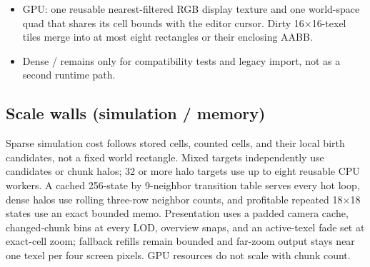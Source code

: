 \begin{itemize}
        drawn only inside their centered canonical rectangle; camera space
        outside it stays background-colored while opposite-edge simulation
        neighbors still wrap. A theme-accented outline keeps all four wrap
        edges visible at a stable screen thickness without tiling the world.
        Their changes conservatively trigger a bounded refill.
  \item GPU: one reusable nearest-filtered RGB display texture and one
        world-space  quad that shares its cell bounds
        with the editor cursor. Dirty 16$\times$16-texel tiles merge into at
        most eight rectangles or their enclosing AABB.
  \item Dense / remains only for
        compatibility tests and legacy import, not as a second runtime path.
\end{itemize}

\subsection{Scale walls (simulation / memory)}
\begin{statusbox}
Sparse simulation cost follows stored cells, counted cells, and their local
birth candidates, not a fixed world rectangle. Mixed targets independently use
candidates or chunk halos; 32 or more halo targets use up to eight reusable CPU
workers. A cached 256-state by 9-neighbor transition table serves every hot
loop, dense halos use rolling three-row neighbor counts, and profitable
repeated 18$\times$18 states use an exact bounded memo. Presentation uses
a padded camera cache, changed-chunk bins at every LOD, overview snaps, and an
active-texel fade set at exact-cell zoom; fallback refills remain bounded and
far-zoom output stays near one texel
per four screen pixels. GPU
resources do not scale with chunk count.
\end{statusbox}

